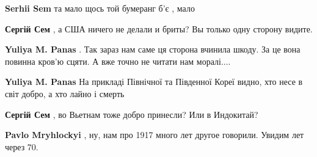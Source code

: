 \begin{itemize}
\begin{itemize}
\begin{itemize}
\textbf{Serhii Sem} та мало щось той бумеранг б'є , мало

 
\textbf{Сергій Сем} , а США ничего не делали и бриты? Вы только одну сторону видите.

 
\textbf{Yuliya M. Panas} . Так зараз нам саме ця сторона вчинила шкоду. За це вона повинна кров'ю сцяти. А вже точно не читати нам моралі....

 
\textbf{Yuliya M. Panas} На прикладі Північної та Південної Кореї видно, хто несе в світ добро, а хто лайно і смерть

 
\textbf{Сергій Сем} , во Вьетнам тоже добро принесли? Или в Индокитай?

 
\textbf{Pavlo Mryhlockyi} , ну, нам про 1917 много лет другое говорили. Увидим лет через 70.

 

\end{itemize}
\end{itemize}
\end{itemize}
